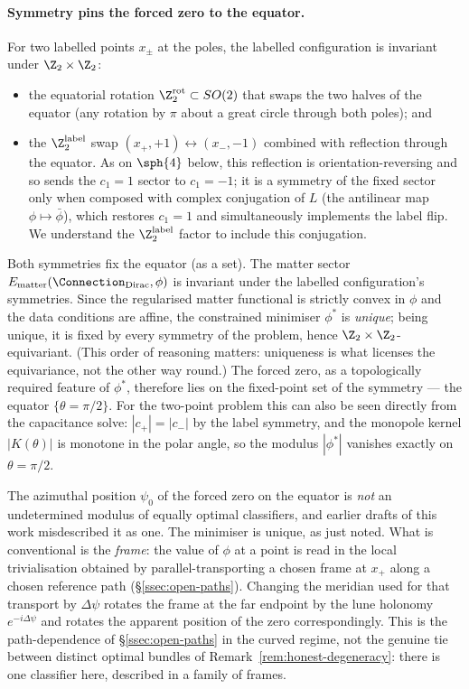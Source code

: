 \paragraph{Symmetry pins the forced zero to the equator.} For two
labelled points $x_\pm$ at the poles, the labelled configuration is
invariant under $\Z_2\times\Z_2$:
\begin{itemize}[leftmargin=2em]
\item the equatorial rotation $\Z_2^{\mathrm{rot}}\subset SO(2)$
that swaps the two halves of the equator (any rotation by $\pi$
about a great circle through both poles); and
\item the $\Z_2^{\mathrm{label}}$ swap $(x_+,+1)\leftrightarrow
(x_-,-1)$ combined with reflection through the equator. As on
$\sph{4}$ below, this reflection is orientation-reversing and so
sends the $c_1=1$ sector to $c_1=-1$; it is a symmetry of the fixed
sector only when composed with complex conjugation of $L$ (the
antilinear map $\phi\mapsto\bar\phi$), which restores $c_1=1$ and
simultaneously implements the label flip. We understand the
$\Z_2^{\mathrm{label}}$ factor to include this conjugation.
\end{itemize}
Both symmetries fix the equator (as a set). The matter
sector $E_{\mathrm{matter}}(\Connection_{\mathrm{Dirac}},\phi)$ is
invariant under the labelled configuration's symmetries. Since the
regularised matter functional is strictly convex in $\phi$ and the
data conditions are affine, the constrained minimiser $\phi^*$ is
\emph{unique}; being unique, it is fixed by every symmetry of the
problem, hence $\Z_2\times\Z_2$-equivariant. (This order of
reasoning matters: uniqueness is what licenses the equivariance, not
the other way round.) The forced zero, as a topologically required
feature of $\phi^*$, therefore lies on the fixed-point set of the
symmetry --- the equator $\{\theta=\pi/2\}$. For the two-point
problem this can also be seen directly from the capacitance solve:
$|c_+|=|c_-|$ by the label symmetry, and the monopole kernel
$|K(\theta)|$ is monotone in the polar angle, so the modulus
$|\phi^*|$ vanishes exactly on $\theta=\pi/2$.

\begin{remark}
\label{rem:S2-azimuth}
The azimuthal position $\psi_0$ of the forced zero on the equator is
\emph{not} an undetermined modulus of equally optimal classifiers,
and earlier drafts of this work misdescribed it as one. The
minimiser is unique, as just noted. What is conventional is the
\emph{frame}: the value of $\phi$ at a point is read in the local
trivialisation obtained by parallel-transporting a chosen frame at
$x_+$ along a chosen reference path
(\S\ref{ssec:open-paths}). Changing the meridian used for that
transport by $\Delta\psi$ rotates the frame at the far endpoint by
the lune holonomy $e^{-i\Delta\psi}$ and rotates the apparent
position of the zero correspondingly. This is the path-dependence of
\S\ref{ssec:open-paths} in the curved regime, not the genuine
tie between distinct optimal bundles of
Remark~\ref{rem:honest-degeneracy}: there is one classifier here,
described in a family of frames.
\end{remark}

